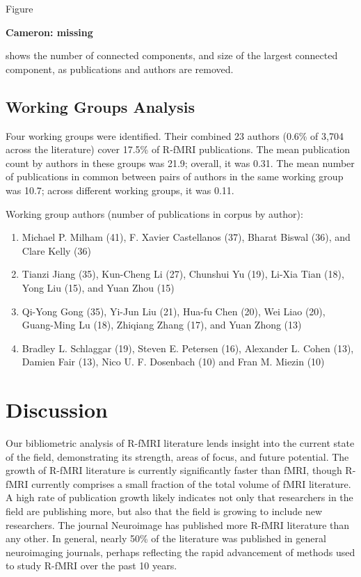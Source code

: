 \documentclass[5p]{elsarticle}
\newcommand\MyCBox[1]{%
  \colorbox{yellow!60}{\begin{varwidth}{\dimexpr\linewidth-2\fboxsep}#1\end{varwidth}}}
\newcommand{\COMMENTCC}[1]{\MyCBox{\textcolor{cc_commentcolor}{\textbf{Cameron:
#1}}}}
\begin{document}
Figure \COMMENTCC{missing} shows the number of connected components, and
size of the largest connected component, as publications and authors are
removed.  

\subsection{Working Groups Analysis}
Four working groups were identified. Their combined 23 authors (0.6\% of
3,704 across the literature) cover 17.5\% of R-fMRI publications. The mean
publication count by authors in these groups was 21.9; overall, it was
0.31. The mean number of publications in common between pairs of authors
in the same working group was 10.7; across different working groups, it
was 0.11.  

Working group authors (number of publications in corpus by author):
\begin{enumerate}
\item Michael P. Milham (41), F. Xavier Castellanos (37), Bharat Biswal
(36), and Clare Kelly (36)
\item Tianzi Jiang (35), Kun-Cheng Li (27), Chunshui Yu (19), Li-Xia Tian
(18), Yong Liu (15), and Yuan Zhou (15)
\item Qi-Yong Gong (35), Yi-Jun Liu (21), Hua-fu Chen (20), Wei Liao (20),
Guang-Ming Lu (18), Zhiqiang Zhang (17), and Yuan Zhong (13) 
\item Bradley L. Schlaggar (19), Steven E. Petersen (16), Alexander L.
Cohen (13), Damien Fair (13), Nico U. F. Dosenbach (10) and Fran M. Miezin
(10)
\end{enumerate}

\section{Discussion}

Our bibliometric analysis of R-fMRI literature lends insight into the
current state of the field, demonstrating its strength, areas of focus,
and future potential. The growth of R-fMRI literature is currently
significantly faster than fMRI, though R-fMRI currently comprises a small
fraction of the total volume of fMRI literature. A high rate of
publication growth likely indicates not only that researchers in the field
are publishing more, but also that the field is growing to include new
researchers.  The journal Neuroimage has published more R-fMRI literature
than any other. In general, nearly 50\% of the literature was published in
general neuroimaging journals, perhaps reflecting the rapid advancement of
methods used to study R-fMRI over the past 10 years. 
\end{document}
